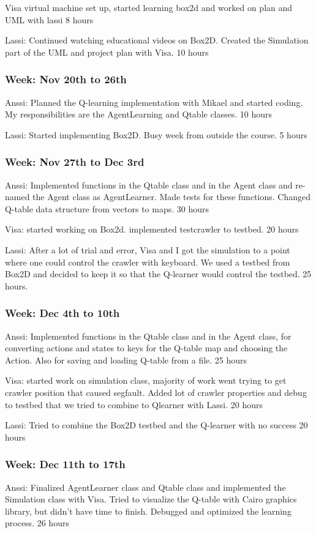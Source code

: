 \documentclass{article}
\begin{document}
Visa
virtual machine set up, started learning box2d and worked on plan
and UML with lassi 
8 hours

Lassi:
Continued watching educational videos on Box2D. Created the Simulation 
part of the UML and project plan with Visa. 
10 hours

\subsubsection{Week: Nov 20th to 26th}
Anssi:
Planned the Q-learning implementation with Mikael and started coding.
My responsibilities are the AgentLearning and Qtable classes.
10 hours

Lassi:
Started implementing Box2D. Busy week from outside the course.
5 hours

\subsubsection{Week: Nov 27th to Dec 3rd}
Anssi:
Implemented functions in the Qtable class and in the Agent class and
re-named the Agent class as AgentLearner. Made tests for these functions.
Changed Q-table data structure from vectors to maps.
30 hours

Visa:
started working on Box2d. implemented testcrawler to testbed.
20 hours

Lassi:
After a lot of trial and error, Visa and I got the simulation to a point 
where one could control the crawler with keyboard. We used a testbed from 
Box2D and decided to keep it so that the Q-learner would control the testbed.
25 hours.

\subsubsection{Week: Dec 4th to 10th}
Anssi:
Implemented functions in the Qtable class and in the Agent class, for
converting actions and states to keys for the Q-table map and choosing
the Action. Also for saving and loading Q-table from a file.
25 hours

Visa:
started work on simulation class, majority of work went trying to get crawler
position that caused segfault. Added lot of crawler properties and debug to testbed
that we tried to combine to Qlearner with Lassi.
20 hours

Lassi: Tried to combine the Box2D testbed and the Q-learner with no success
20 hours

\subsubsection{Week: Dec 11th to 17th}
Anssi:
Finalized AgentLearner class and Qtable class and implemented the
Simulation class with Visa. Tried to visualize the Q-table with
Cairo graphics library, but didn’t have time to finish. Debugged
and optimized  the learning process.
26 hours
\end{document}
